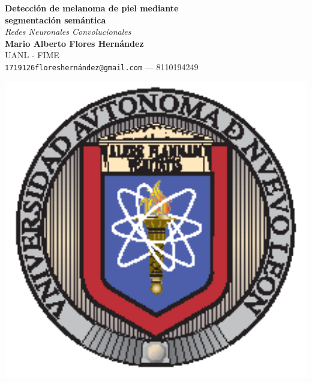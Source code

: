 \documentclass[a0,portrait]{a0poster}
\begin{document}
\begin{minipage}[b]{0.75\linewidth}
    \veryHuge \color{NavyBlue} \textbf{Detección de melanoma de piel mediante \\ segmentación semántica} \color{Black} \\[0.5cm]
    \Huge \textit{Redes Neuronales Convolucionales}\\[2cm]
    \huge \textbf{Mario Alberto Flores Hernández}\\[0.5cm]
    \huge UANL - FIME \\[0.4cm]
    \Large \texttt{1719126floreshernández@gmail.com} --- 8110194249
\end{minipage}
%
\begin{minipage}[b]{0.25\linewidth}
    \includegraphics[width=20cm]{uanl.eps}\\
\end{minipage}
\vspace{1cm}
\end{document}
